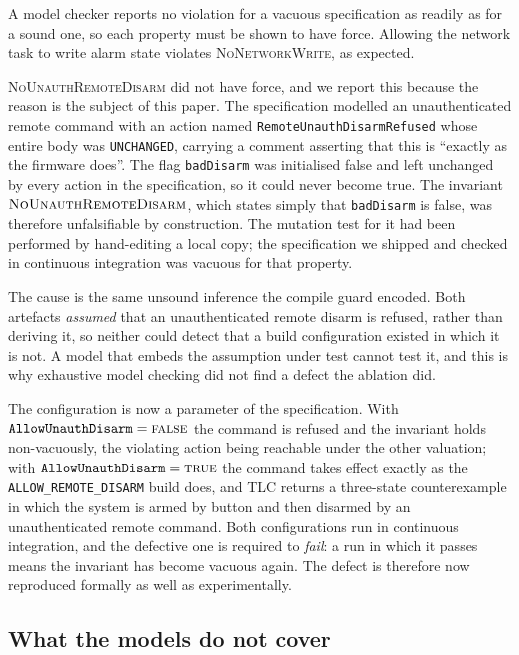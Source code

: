A model checker reports no violation for a vacuous specification as readily as for a sound one,
so each property must be shown to have force. Allowing the network task to write alarm state
violates \textsc{NoNetworkWrite}, as expected.

\textsc{NoUnauthRemoteDisarm} did not have force, and we report this because the reason is the
subject of this paper. The specification modelled an unauthenticated remote command with an
action named \texttt{RemoteUnauthDisarmRefused} whose entire body was
\texttt{UNCHANGED}, carrying a comment asserting that this is ``exactly as the firmware does''.
The flag \texttt{badDisarm} was initialised false and left unchanged by every action in the
specification, so it could never become true. The invariant
$\textsc{NoUnauthRemoteDisarm}$, which states simply that \texttt{badDisarm} is false, was
therefore unfalsifiable by construction. The mutation test for it had been performed by hand-editing a local copy; the
specification we shipped and checked in continuous integration was vacuous for that property.

The cause is the same unsound inference the compile guard encoded. Both artefacts
\emph{assumed} that an unauthenticated remote disarm is refused, rather than deriving it, so
neither could detect that a build configuration existed in which it is not. A model that
embeds the assumption under test cannot test it, and this is why exhaustive model checking did
not find a defect the ablation did.

The configuration is now a parameter of the specification. With
$\texttt{AllowUnauthDisarm} = \textsc{false}$ the command is refused and the invariant holds
non-vacuously, the violating action being reachable under the other valuation; with
$\texttt{AllowUnauthDisarm} = \textsc{true}$ the command takes effect exactly as the
\texttt{ALLOW\_REMOTE\_DISARM} build does, and TLC returns a three-state counterexample in which
the system is armed by button and then disarmed by an unauthenticated remote command. Both
configurations run in continuous integration, and the defective one is required to \emph{fail}:
a run in which it passes means the invariant has become vacuous again. The defect is therefore
now reproduced formally as well as experimentally.

\subsection{What the models do not cover}

